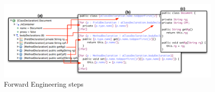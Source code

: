 \begin{figure}[!ht]
\centering
  \includegraphics[scale=0.48]{figure/Forward_Engineering2}
\caption{Forward Engineering steps}
\label{fig:forward_Engineering}
\end{figure}